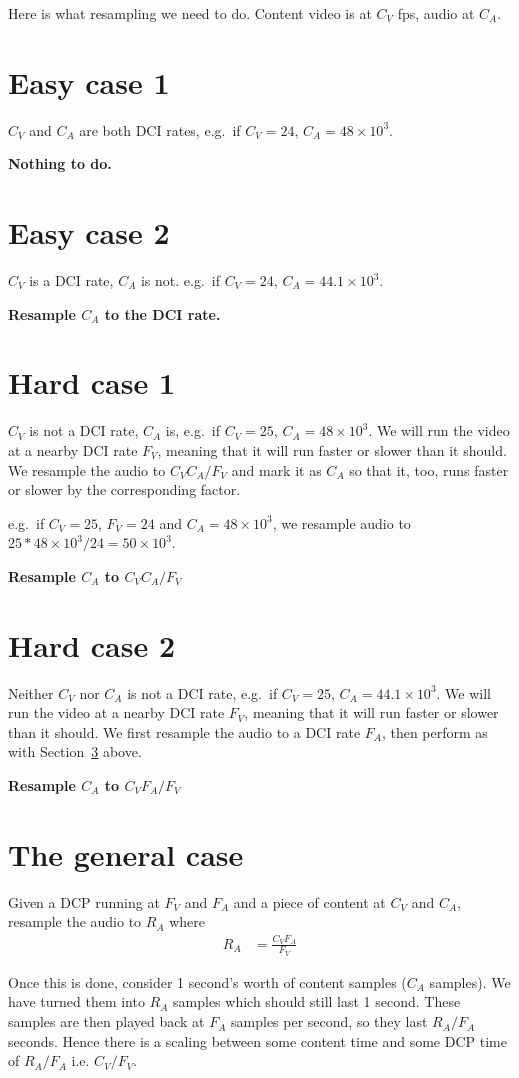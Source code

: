 \documentclass{article}
\begin{document}
Here is what resampling we need to do.  Content video is at $C_V$ fps, audio at $C_A$.  

\section{Easy case 1}

$C_V$ and $C_A$ are both DCI rates, e.g.\ if $C_V = 24$, $C_A = 48\times{}10^3$.

\medskip
\textbf{Nothing to do.}

\section{Easy case 2}

$C_V$ is a DCI rate, $C_A$ is not.  e.g.\ if $C_V = 24$, $C_A = 44.1\times{}10^3$.

\medskip
\textbf{Resample $C_A$ to the DCI rate.}

\section{Hard case 1}
\label{sec:hard1}

$C_V$ is not a DCI rate, $C_A$ is, e.g.\ if $C_V = 25$, $C_A =
48\times{}10^3$.  We will run the video at a nearby DCI rate $F_V$,
meaning that it will run faster or slower than it should.  We resample
the audio to $C_V C_A / F_V$ and mark it as $C_A$ so that it, too,
runs faster or slower by the corresponding factor.

e.g.\ if $C_V = 25$, $F_V = 24$ and $C_A = 48\times{}10^3$, we
resample audio to $25 * 48\times{}10^3 / 24 = 50\times{}10^3$.

\medskip
\textbf{Resample $C_A$ to $C_V C_A / F_V$}

\section{Hard case 2}

Neither $C_V$ nor $C_A$ is not a DCI rate, e.g.\ if $C_V = 25$, $C_A =
44.1\times{}10^3$.  We will run the video at a nearby DCI rate $F_V$,
meaning that it will run faster or slower than it should.  We first
resample the audio to a DCI rate $F_A$, then perform as with
Section~\ref{sec:hard1} above.

\medskip
\textbf{Resample $C_A$ to $C_V F_A / F_V$}


\section{The general case}

Given a DCP running at $F_V$ and $F_A$ and a piece of content at $C_V$
and $C_A$, resample the audio to $R_A$ where
\begin{align*}
R_A &= \frac{C_V F_A}{F_V}
\end{align*}

Once this is done, consider 1 second's worth of content samples ($C_A$
samples).  We have turned them into $R_A$ samples which should still
last 1 second.  These samples are then played back at $F_A$ samples
per second, so they last $R_A / F_A$ seconds.  Hence there is a
scaling between some content time and some DCP time of $R_A / F_A$
i.e. $C_V / F_V$.
\end{document}
